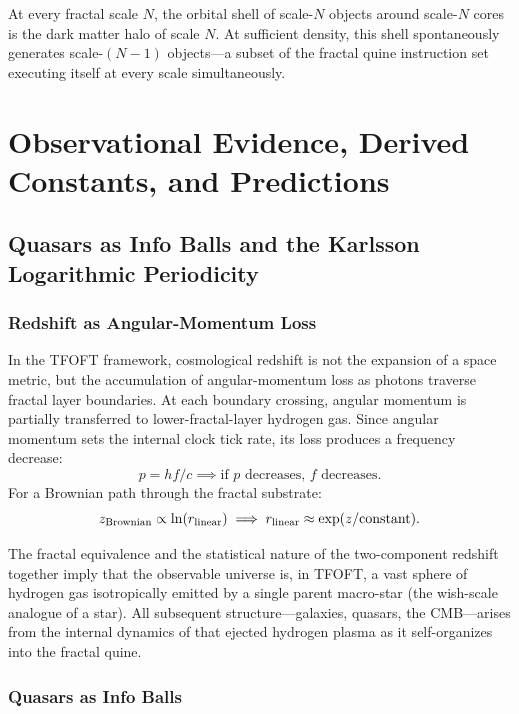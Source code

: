 \documentclass[11pt,a4paper]{article}
\begin{document}
At every fractal scale $N$, the orbital shell of scale-$N$ objects around scale-$N$ cores is the dark matter halo of scale $N$. At sufficient density, this shell spontaneously generates scale-$(N-1)$ objects---a subset of the fractal quine instruction set executing itself at every scale simultaneously.


\section{Observational Evidence, Derived Constants, and Predictions}
\label{sec:predictions}

\subsection{Quasars as Info Balls and the Karlsson Logarithmic Periodicity}

\subsubsection{Redshift as Angular-Momentum Loss}

In the TFOFT framework, cosmological redshift is not the expansion of a space metric, but the accumulation of angular-momentum loss as photons traverse fractal layer boundaries. At each boundary crossing, angular momentum is partially transferred to lower-fractal-layer hydrogen gas. Since angular momentum sets the internal clock tick rate, its loss produces a frequency decrease:
\[
p = hf/c \implies \text{if } p \text{ decreases, } f \text{ decreases.}
\]
For a Brownian path through the fractal substrate:
\[
z_{\rm Brownian} \propto \ln(r_{\rm linear})
\implies r_{\rm linear} \approx \exp(z/\text{constant}).
\]

The fractal equivalence and the statistical nature of the two-component redshift together imply that the observable universe is, in TFOFT, a vast sphere of hydrogen gas isotropically emitted by a single parent macro-star (the wish-scale analogue of a star). All subsequent structure---galaxies, quasars, the CMB---arises from the internal dynamics of that ejected hydrogen plasma as it self-organizes into the fractal quine.

\subsubsection{Quasars as Info Balls}
\end{document}
